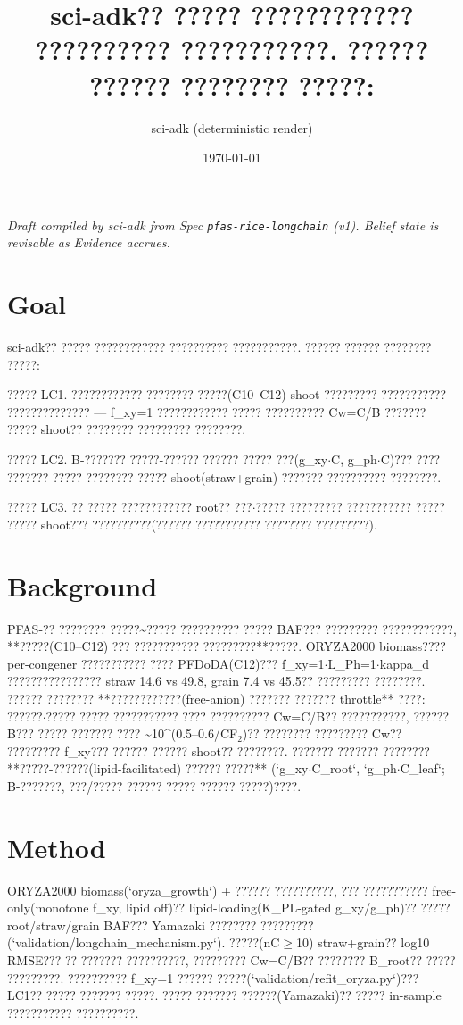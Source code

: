 \documentclass{article}
\title{sci-adk?? ????? ???????????? ?????????? ???????????. ?????? ?????? ???????? ?????:}
\author{sci-adk (deterministic render)}
\date{\today}
\begin{document}
\maketitle

\noindent\textit{Draft compiled by sci-adk from Spec \texttt{pfas-rice-longchain} (v1). Belief state is revisable as Evidence accrues.}

\section{Goal}
sci-adk?? ????? ???????????? ?????????? ???????????. ?????? ?????? ???????? ?????:

????? LC1. ???????????? ???????? ?????(C10--C12) shoot ????????? ??????????? ?????????????? ---
f\_xy=1 ???????????? ????? ?????????? Cw=C/B ??????? ????? shoot?? ???????? ????????? ????????.

????? LC2. B-??????? ?????-?????? ?????? ????? ???(g\_xy$\cdot$C, g\_ph$\cdot$C)??? ???? ??????? ????? ????????
????? shoot(straw+grain) ??????? ?????????? ????????.

????? LC3. ?? ????? ???????????? root?? ???$\cdot$????? ????????? ??????????? ????? ????? shoot???
??????????(?????? ??????????? ???????? ?????????).

\section{Background}
PFAS-?? ???????? ?????\textasciitilde{}????? ?????????? ????? BAF??? ????????? ????????????, **?????(C10--C12)
??? ??????????? ?????????**?????. ORYZA2000 biomass???? per-congener ??????????? ????
PFDoDA(C12)??? f\_xy=1$\cdot$L\_Ph=1$\cdot$kappa\_d ???????????????? straw 14.6 vs 49.8, grain 7.4 vs
45.5?? ????????? ????????. ?????? ???????? **????????????(free-anion) ??????? ??????? throttle**
????: ??????$\cdot$????? ????? ??????????? ???? ?????????? Cw=C/B?? ???????????, ?????? B??? ?????
??????? ???? \textasciitilde{}10\textasciicircum{}(0.5--0.6/CF$_2$)?? ???????? ????????? Cw?? ????????? f\_xy??? ?????? ??????
shoot?? ????????. ??????? ??????? ???????? **?????-??????(lipid-facilitated) ?????? ?????**
(`g\_xy$\cdot$C\_root`, `g\_ph$\cdot$C\_leaf`; B-???????, ???/????? ?????? ????? ?????? ?????)????.

\section{Method}
ORYZA2000 biomass(`oryza\_growth`) + ?????? ??????????, ??? ??????????? free-only(monotone
f\_xy, lipid off)?? lipid-loading(K\_PL-gated g\_xy/g\_ph)?? ????? root/straw/grain BAF???
Yamazaki ???????? ?????????(`validation/longchain\_mechanism.py`). ?????(nC$\geq$10)
straw+grain?? log10 RMSE??? ?? ??????? ??????????, ????????? Cw=C/B?? ???????? B\_root?? ?????
?????????. ?????????? f\_xy=1 ?????? ?????(`validation/refit\_oryza.py`)??? LC1?? ????? ???????
?????. ????? ??????? ??????(Yamazaki)?? ????? in-sample ??????????? ??????????.
\end{document}
